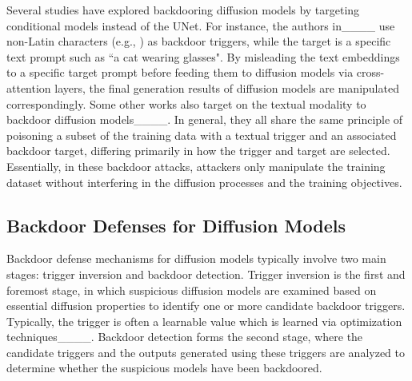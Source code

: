Several studies have explored backdooring diffusion models by targeting conditional models instead of the UNet. For instance, the authors in____ use non-Latin characters (e.g., \Smiley{}) as backdoor triggers, while the target is a specific text prompt such as ``a cat wearing glasses". By misleading the text embeddings to a specific target prompt before feeding them to diffusion models via cross-attention layers, the final generation results of diffusion models are manipulated correspondingly. Some other works also target on the textual modality to backdoor diffusion models____. In general, they all share the same principle of poisoning a subset of the training data with a textual trigger and an associated backdoor target, differing primarily in how the trigger and target are selected. 
Essentially, in these backdoor attacks, attackers only manipulate the training dataset without interfering in the diffusion processes and the training objectives.


\subsection{Backdoor Defenses for Diffusion Models}
Backdoor defense mechanisms for diffusion models typically involve two main stages: trigger inversion and backdoor detection. Trigger inversion is the first and foremost stage, in which suspicious diffusion models are examined based on essential diffusion properties to identify one or more candidate backdoor triggers. Typically, the trigger is often a learnable value which is learned via optimization techniques____. Backdoor detection forms the second stage, where the candidate triggers and the outputs generated using these triggers are analyzed to determine whether the suspicious models have been backdoored. 

